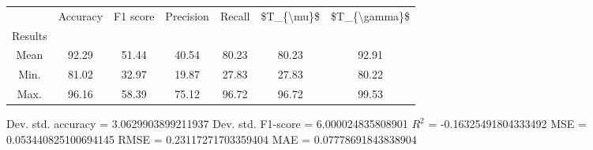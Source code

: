 \begin{tabular}{|c|c|c|c|c|c|c|}
\toprule
{} &  Accuracy &  F1 score &  Precision &  Recall &  \$T\_\{\textbackslash mu\}\$ &  \$T\_\{\textbackslash gamma\}\$ \\
Results &           &           &            &         &            &               \\
\hline
Mean    &     92.29 &     51.44 &      40.54 &   80.23 &      80.23 &         92.91 \\
Min.    &     81.02 &     32.97 &      19.87 &   27.83 &      27.83 &         80.22 \\
Max.    &     96.16 &     58.39 &      75.12 &   96.72 &      96.72 &         99.53 \\
\bottomrule
\end{tabular}

 Dev. std. accuracy = 3.0629903899211937
 Dev. std. F1-score = 6.000024835808901
 $R^2$ = -0.16325491804333492
 MSE = 0.053440825100694145
 RMSE = 0.23117271703359404
 MAE = 0.07778691843838904
